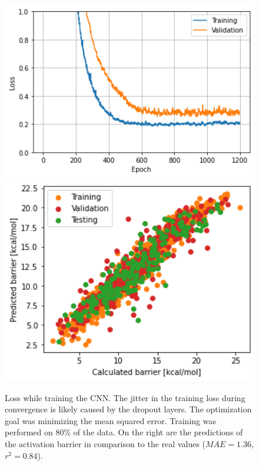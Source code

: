 \begin{figure}[!htb]
    \endminipage\hfill
      \includegraphics[width=1.0\textwidth]{figures/regression/fourier/cnn/lossCNN.png}
    \endminipage\hfill
      \includegraphics[width=1.0\textwidth]{figures/regression/fourier/cnn/scatterCNN.png}
    \endminipage\hfill
    \endminipage
    \caption{
        Loss while training the CNN. The jitter in the training loss during convergence is likely caused by the dropout layers. 
        The optimization goal was minimizing the mean squared error. 
        Training was performed on 80\% of the data.
        On the right are the predictions of the activation barrier in comparison to the real values ($MAE=1.36$, $r^2=0.84$).
    }
    \label{fig:fourier_cnn}
\end{figure}

